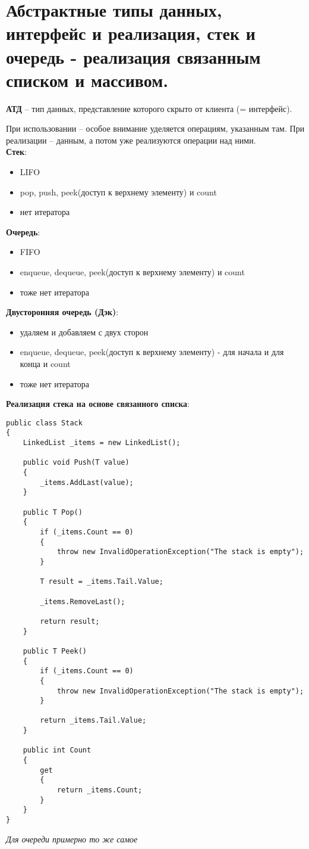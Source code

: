 \section {Абстрактные типы данных, интерфейс и реализация, стек и очередь - реализация связанным списком и массивом.}

\noindent\textbf{АТД} \--- тип данных, представление которого скрыто от клиента (= интерфейс).

При использовании \--- особое внимание уделяется операциям, указанным там. При реализации \--- данным, а потом уже реализуются операции над ними. \\

\noindent\textbf{Стек}:
\begin{itemize}
\item LIFO
\item pop, push, peek(доступ к верхнему элементу) и count
\item нет итератора


\end{itemize}

\noindent\textbf{Очередь}:
\begin{itemize}
\item FIFO
\item enqueue, dequeue, peek(доступ к верхнему элементу) и count
\item тоже нет итератора
\end{itemize}

\noindent\textbf{Двусторонняя очередь (Дэк)}:
\begin{itemize}
\item удаляем и добавляем с двух сторон
\item enqueue, dequeue, peek(доступ к верхнему элементу) - для начала и для конца и count
\item тоже нет итератора
\end{itemize}


\noindent\textbf{Реализация стека на основе связанного списка}:
\begin{verbatim}
public class Stack
{
    LinkedList _items = new LinkedList();

    public void Push(T value)
    {
        _items.AddLast(value);
    }

    public T Pop()
    {
        if (_items.Count == 0)
    	{
        	throw new InvalidOperationException("The stack is empty");
    	}

    	T result = _items.Tail.Value;

    	_items.RemoveLast();

    	return result;
    }

    public T Peek()
    {
        if (_items.Count == 0)
    	{
        	throw new InvalidOperationException("The stack is empty");
    	}

    	return _items.Tail.Value;
    }

    public int Count
    {
        get
   		{
        	return _items.Count;
    	}
    }
}
\end{verbatim}
\noindent\textit{Для очереди примерно то же самое}

